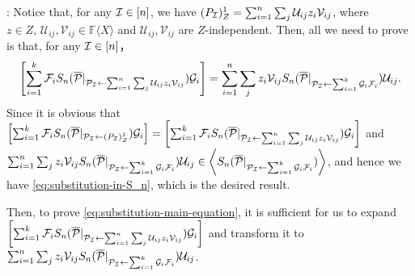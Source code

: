 \documentclass[12pt,reqno]{article}
\newcommand\F{\ensuremath{\mathbb F}}
\newcommand{\freea}{\ensuremath{\F\langle X\rangle}}
\newenvironment{proof}{\QuadSpace\par\noindent{\bf Proof}:}{\EndProof\HalfSpace}
\newcommand{\QuadSpace}{\vspace{0.25\baselineskip}}
\newcommand{\HalfSpace}{\vspace{0.5\baselineskip}}
\newcommand{\EndProof}{ \hfill \vrule width 1ex height 1ex depth 0pt }
\renewcommand{\t}[1]{\overline{#1}}
\newcommand{\anbra}[1]{\ensuremath{\left[ #1\right]}}
\newcommand{\zd}[2]{(#1)_Z^{#2}}
\newcommand{\ideal}[1]{\ensuremath{\left\langle #1\right\rangle}}
\newcommand\ii{{\cal I}}
\newcommand{\U}{\mathcal U_{ij}}
\newcommand{\V}{\mathcal V_{ij}}
\newcommand{\uzv}{\sum_{i=1}^n\sum_{j}\U z_i\V}
\begin{document}
\begin{proof}
Notice that, for any ${\ii}\in [n]$, we have  $\zd{ P_\ii}{1 }=\uzv$, where $z \in Z,\, \U,\V\in\freea$ and $\U,\V$ are $Z$-independent.
Then, all we need to prove is that, for any $\ii\in [n]$，
\begin{equation}\label{eq:substitution-main-equation}
\anbra{\sum_{i=1}^k\mathcal {F}_i  S_{n}(\t{\mathcal P}|_{\mathcal P _\ii\leftarrow \uzv})\mathcal {G}_i } =  \sum_{i=1}^n \sum_j z_i \V S_{n}(\t{\mathcal P}|_{ \mathcal P _\ii\leftarrow \sum_{i=1}^k\mathcal {G}_i \mathcal {F}_i})\U.
\end{equation}
Since it is obvious that $\anbra{\sum_{i=1}^k\mathcal F_i S_{n}(\t {\mathcal P}|_{{\mathcal P}_\ii\leftarrow \zd{P_\ii}{1}})\mathcal G_i }=\anbra{\sum_{i=1}^k\mathcal {F}_i  S_{n}(\t{\mathcal P}|_{\mathcal P _\ii\leftarrow \uzv})\mathcal {G}_i }$ and $\sum_{i=1}^n \sum_j z_i \V S_{n}(\t{\mathcal P}|_{ \mathcal P _\ii\leftarrow \sum_{i=1}^k\mathcal 	{G}_i \mathcal {F}_i})\U\in  \ideal{ S_{n}(\t{\mathcal P}|_{{\mathcal P }_\ii\leftarrow \sum_{i=1}^k\mathcal G_i\mathcal F_i})}$, 
	and hence we have 	\eqref{eq:substitution-in-S_n}, which is the desired result.

Then, to prove \eqref{eq:substitution-main-equation}, it is sufficient for us to expand  $\anbra{\sum_{i=1}^k\mathcal {F}_i  S_{n}(\t{\mathcal P}|_{\mathcal P _\ii\leftarrow \uzv})\mathcal {G}_i }$ and  transform it to $ \sum_{i=1}^n \sum_j z_i \V S_{n}(\t{\mathcal P}|_{ \mathcal P _\ii\leftarrow \sum_{i=1}^k\mathcal {G}_i \mathcal {F}_i})\U$. 


\end{proof}
\end{document}
